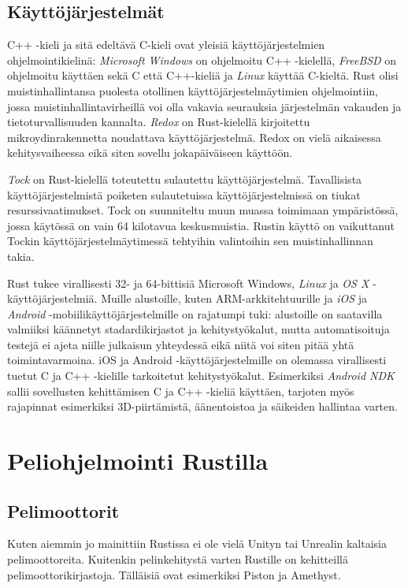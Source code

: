 \documentclass[finnish]{tktltiki2}
\theoremstyle{definition}
\theoremstyle{remark}
\begin{document}
\subsection{Käyttöjärjestelmät}

C++ -kieli ja sitä edeltävä C-kieli ovat yleisiä käyttöjärjestelmien ohjelmointikielinä: \textit{Microsoft Windows} on ohjelmoitu C++ -kielellä, \textit{FreeBSD} on ohjelmoitu käyttäen sekä C että C++-kieliä ja \textit{Linux} käyttää C-kieltä. Rust olisi muistinhallintansa puolesta otollinen käyttöjärjestelmäytimien ohjelmointiin, jossa muistinhallintavirheillä voi olla vakavia seurauksia järjestelmän vakauden ja tietoturvallisuuden kannalta. \textit{Redox} on Rust-kielellä kirjoitettu mikroydinrakennetta noudattava käyttöjärjestelmä.\cite{WhatRedoxIs} Redox on vielä aikaisessa kehitysvaiheessa eikä siten sovellu jokapäiväiseen käyttöön.

\textit{Tock} on Rust-kielellä toteutettu sulautettu käyttöjärjestelmä.\cite{OwnershipIsTheft} Tavallisista käyttöjärjestelmistä poiketen sulautetuissa käyttöjärjestelmissä on tiukat resurssivaatimukset. Tock on suunniteltu muun muassa toimimaan ympäristössä, jossa käytössä on vain 64 kilotavua keskusmuistia. Rustin käyttö on vaikuttanut Tockin käyttöjärjestelmäytimessä tehtyihin valintoihin sen muistinhallinnan takia.\cite{CaseForWritingKernel}

Rust tukee virallisesti 32- ja 64-bittisiä Microsoft Windows, \textit{Linux} ja \textit{OS X} -käyttöjärjestelmiä.\cite{RustPlatformSupport} Muille alustoille, kuten ARM-arkkitehtuurille ja \textit{iOS} ja \textit{Android} -mobiilikäyttöjärjestelmille on rajatumpi tuki: alustoille on saatavilla valmiiksi käännetyt stadardikirjastot ja kehitystyökalut, mutta automatisoituja testejä ei ajeta niille julkaisun yhteydessä eikä niitä voi siten pitää yhtä toimintavarmoina. iOS ja Android -käyttöjärjestelmille on olemassa virallisesti tuetut C ja C++ -kielille tarkoitetut kehitystyökalut. Esimerkiksi \textit{Android NDK} sallii sovellusten kehittämisen C ja C++ -kieliä käyttäen, tarjoten myös rajapinnat esimerkiksi 3D-piirtämistä, äänentoistoa ja säikeiden hallintaa varten.\cite{AndroidNDK}

\section{Peliohjelmointi Rustilla}

\subsection{Pelimoottorit}
Kuten aiemmin jo mainittiin Rustissa ei ole vielä Unityn tai Unrealin kaltaisia pelimoottoreita. Kuitenkin pelinkehitystä varten Rustille on kehitteillä pelimoottorikirjastoja. Tälläisiä ovat esimerkiksi Piston ja Amethyst. 
\end{document}
